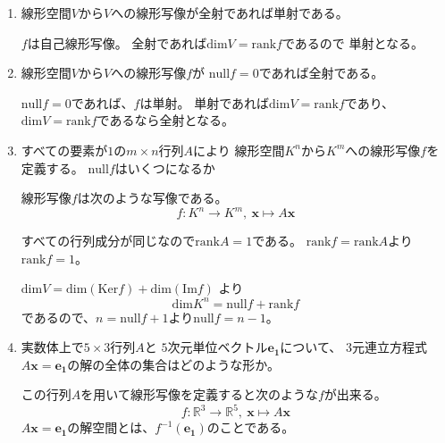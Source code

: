 \documentclass[12pt,b5paper]{ltjsarticle}
\begin{document}
\begin{enumerate}
 \item 線形空間$V$から$V$への線形写像が全射であれば単射である。

       \dotfill

       $f$は自己線形写像。
       全射であれば$\mathrm{dim} V = \mathrm{rank} f$であるので
       単射となる。

       \hrulefill
 \item 線形空間$V$から$V$への線形写像$f$が $\mathrm{null} f = 0$であれば全射である。

       \dotfill

       $\mathrm{null}f=0$であれば、$f$は単射。
       単射であれば$\mathrm{dim} V = \mathrm{rank} f$であり、
       $\mathrm{dim} V = \mathrm{rank} f$であるなら全射となる。

       \hrulefill
 \item すべての要素が$1$の$m\times n$行列$A$により
       線形空間$K^n$から$K^m$への線形写像$f$を定義する。
       $\mathrm{null}f$はいくつになるか

       \dotfill

       線形写像$f$は次のような写像である。
       \begin{equation}
        f: K^n \rightarrow K^m , \ \bm{x} \mapsto A\bm{x}
       \end{equation}

       すべての行列成分が同じなので$\mathrm{rank}A =1$である。
       $\mathrm{rank}f=\mathrm{rank}A$より$\mathrm{rank}f=1$。

       $\mathrm{dim} V = \mathrm{dim}(\mathrm{Ker} f) +  \mathrm{dim}(\mathrm{Im}f)$
       より
       \begin{equation}
        \mathrm{dim}K^n = \mathrm{null}f + \mathrm{rank}f
       \end{equation}
       であるので、$n=\mathrm{null}f + 1$より$\mathrm{null}f = n-1$。

       \hrulefill
 \item 実数体上で$5\times 3$行列$A$と
       $5$次元単位ベクトル$\bm{e_1}$について、
       $3$元連立方程式$A\bm{x}=\bm{e_1}$の解の全体の集合はどのような形か。

       \dotfill

       この行列$A$を用いて線形写像を定義すると次のような$f$が出来る。
       \begin{equation}
        f: \mathbb{R}^3 \rightarrow \mathbb{R}^5, \ \bm{x} \mapsto A\bm{x}
       \end{equation}
       $A\bm{x}=\bm{e_1}$の解空間とは、$f^{-1}(\bm{e_1})$のことである。


\end{enumerate}
\end{document}
